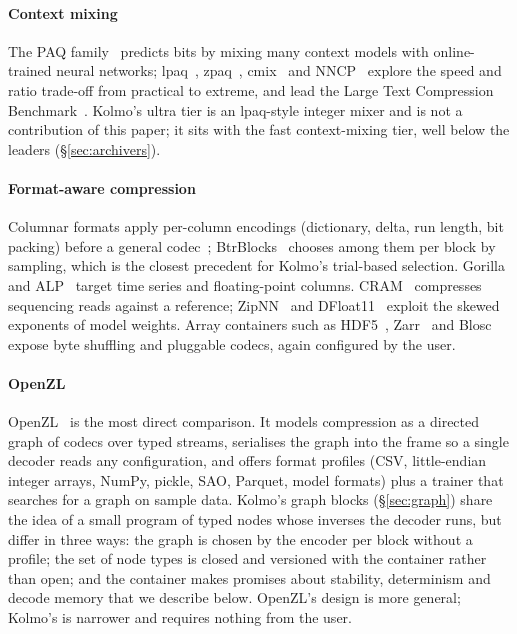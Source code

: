 \documentclass[conference]{IEEEtran}
\begin{document}
\paragraph*{Context mixing} The PAQ family~\cite{paq,dce_book} predicts bits by mixing many context models with
online-trained neural networks; lpaq~\cite{lpaq}, zpaq~\cite{zpaq}, cmix~\cite{cmix} and NNCP~\cite{nncp,nncp_v2} explore
the speed and ratio trade-off from practical to extreme, and lead the Large Text Compression
Benchmark~\cite{ltcb}. Kolmo's ultra tier is an lpaq-style integer mixer and is not a contribution of this paper; it
sits with the fast context-mixing tier, well below the leaders (\S\ref{sec:archivers}).

\paragraph*{Format-aware compression} Columnar formats apply per-column encodings (dictionary, delta, run length,
bit packing) before a general codec~\cite{parquet}; BtrBlocks~\cite{btrblocks} chooses among them per block by
sampling, which is the closest precedent for Kolmo's trial-based selection. Gorilla~\cite{gorilla} and
ALP~\cite{alp} target time series and floating-point columns. CRAM~\cite{cram,cram31} compresses sequencing reads
against a reference; ZipNN~\cite{zipnn} and DFloat11~\cite{dfloat11} exploit the skewed exponents of model weights.
Array containers such as HDF5~\cite{hdf5}, Zarr~\cite{zarr} and Blosc~\cite{blosc} expose byte shuffling and
pluggable codecs, again configured by the user.

\paragraph*{OpenZL} OpenZL~\cite{openzl} is the most direct comparison. It models compression as a directed graph of
codecs over typed streams, serialises the graph into the frame so a single decoder reads any configuration, and
offers format profiles (CSV, little-endian integer arrays, NumPy, pickle, SAO, Parquet, model formats) plus a trainer
that searches for a graph on sample data. Kolmo's graph blocks (\S\ref{sec:graph}) share the idea of a small program
of typed nodes whose inverses the decoder runs, but differ in three ways: the graph is chosen by the encoder per block
without a profile; the set of node types is closed and versioned with the container rather than open; and the
container makes promises about stability, determinism and decode memory that we describe below. OpenZL's design is
more general; Kolmo's is narrower and requires nothing from the user.
\end{document}
